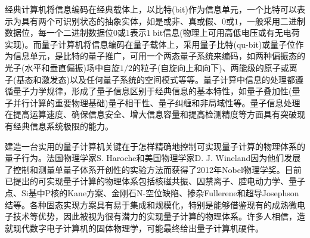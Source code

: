 经典计算机将信息编码在经典载体上，以比特(bit)作为信息单元，一个比特可以表示为具有两个可识别状态的抽象实体，如是或非、真或假、$0$或$1$，一般采用二进制数据位，每一个二进制数据位$0$或$1$表示$1~\mathrm{bit}$信息(物理上可用高低电压或有无电荷实现)。而量子计算机将信息编码在量子载体上，采用量子比特(qu-bit)或量子位作为信息单元，是比特的量子推广，可用一个两态量子系统来编码，如两种偏振态的光子(水平和垂直偏振)场中自旋$1/2$的粒子(自旋向上和向下)、两能级的原子或离子(基态和激发态)以及任何量子系统的空间模式等等。量子计算中信息的处理都遵循量子力学规律，形成了量子信息区别于经典信息的基本特性，如量子叠加性(量子并行计算的重要物理基础)量子相干性、量子纠缠和非局域性等。量子信息处理在提高运算速度、确保信息安全、增大信息容量和提高检测精度等方面具有突破现有经典信息系统极限的能力。

建造一台实用的量子计算机关键在于怎样精确地控制可实现量子计算的物理体系的量子行为。法国物理学家S. Haroche和美国物理学家D. J. Wineland因为他们发展了控制和测量单量子体系开创性的实验方法而获得了2012年Nobel物理学奖。目前已提出的可实现量子计算的物理体系包括核磁共振、囚禁离子、腔电动力学、量子点、Si基中P核的Kane方案、金刚石N-空位缺陷、掺杂Fullerene和超导Josephson结等。各种固态实现方案具有易于集成和规模化，特别是能够借鉴现有的成熟微电子技术等优势，因此被视为很有潜力的实现量子计算的物理体系。许多人相信，造就现代数字电子计算机的固体物理学，可能最终给出量子计算机硬件。
